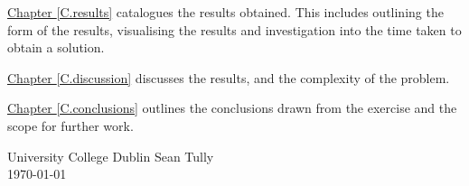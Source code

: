 \hyperref[C.results]{Chapter \ref*{C.results}} catalogues the results obtained.
This includes outlining the form of the results, visualising the results and
investigation into the time taken to obtain a solution.

\hyperref[C.discussion]{Chapter \ref*{C.discussion}} discusses the results, 
and the complexity of the problem.

\hyperref[C.conclusions]{Chapter \ref*{C.conclusions}} outlines the conclusions
drawn from the exercise and the scope for further work.

\vspace{2em}

University College Dublin \hfill Sean Tully \\
\today 
